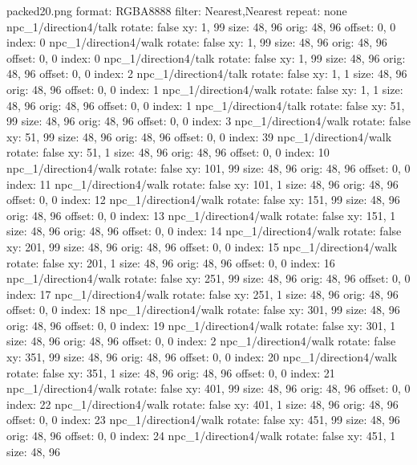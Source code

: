 packed20.png
format: RGBA8888
filter: Nearest,Nearest
repeat: none
npc_1/direction4/talk
  rotate: false
  xy: 1, 99
  size: 48, 96
  orig: 48, 96
  offset: 0, 0
  index: 0
npc_1/direction4/walk
  rotate: false
  xy: 1, 99
  size: 48, 96
  orig: 48, 96
  offset: 0, 0
  index: 0
npc_1/direction4/talk
  rotate: false
  xy: 1, 99
  size: 48, 96
  orig: 48, 96
  offset: 0, 0
  index: 2
npc_1/direction4/talk
  rotate: false
  xy: 1, 1
  size: 48, 96
  orig: 48, 96
  offset: 0, 0
  index: 1
npc_1/direction4/walk
  rotate: false
  xy: 1, 1
  size: 48, 96
  orig: 48, 96
  offset: 0, 0
  index: 1
npc_1/direction4/talk
  rotate: false
  xy: 51, 99
  size: 48, 96
  orig: 48, 96
  offset: 0, 0
  index: 3
npc_1/direction4/walk
  rotate: false
  xy: 51, 99
  size: 48, 96
  orig: 48, 96
  offset: 0, 0
  index: 39
npc_1/direction4/walk
  rotate: false
  xy: 51, 1
  size: 48, 96
  orig: 48, 96
  offset: 0, 0
  index: 10
npc_1/direction4/walk
  rotate: false
  xy: 101, 99
  size: 48, 96
  orig: 48, 96
  offset: 0, 0
  index: 11
npc_1/direction4/walk
  rotate: false
  xy: 101, 1
  size: 48, 96
  orig: 48, 96
  offset: 0, 0
  index: 12
npc_1/direction4/walk
  rotate: false
  xy: 151, 99
  size: 48, 96
  orig: 48, 96
  offset: 0, 0
  index: 13
npc_1/direction4/walk
  rotate: false
  xy: 151, 1
  size: 48, 96
  orig: 48, 96
  offset: 0, 0
  index: 14
npc_1/direction4/walk
  rotate: false
  xy: 201, 99
  size: 48, 96
  orig: 48, 96
  offset: 0, 0
  index: 15
npc_1/direction4/walk
  rotate: false
  xy: 201, 1
  size: 48, 96
  orig: 48, 96
  offset: 0, 0
  index: 16
npc_1/direction4/walk
  rotate: false
  xy: 251, 99
  size: 48, 96
  orig: 48, 96
  offset: 0, 0
  index: 17
npc_1/direction4/walk
  rotate: false
  xy: 251, 1
  size: 48, 96
  orig: 48, 96
  offset: 0, 0
  index: 18
npc_1/direction4/walk
  rotate: false
  xy: 301, 99
  size: 48, 96
  orig: 48, 96
  offset: 0, 0
  index: 19
npc_1/direction4/walk
  rotate: false
  xy: 301, 1
  size: 48, 96
  orig: 48, 96
  offset: 0, 0
  index: 2
npc_1/direction4/walk
  rotate: false
  xy: 351, 99
  size: 48, 96
  orig: 48, 96
  offset: 0, 0
  index: 20
npc_1/direction4/walk
  rotate: false
  xy: 351, 1
  size: 48, 96
  orig: 48, 96
  offset: 0, 0
  index: 21
npc_1/direction4/walk
  rotate: false
  xy: 401, 99
  size: 48, 96
  orig: 48, 96
  offset: 0, 0
  index: 22
npc_1/direction4/walk
  rotate: false
  xy: 401, 1
  size: 48, 96
  orig: 48, 96
  offset: 0, 0
  index: 23
npc_1/direction4/walk
  rotate: false
  xy: 451, 99
  size: 48, 96
  orig: 48, 96
  offset: 0, 0
  index: 24
npc_1/direction4/walk
  rotate: false
  xy: 451, 1
  size: 48, 96
